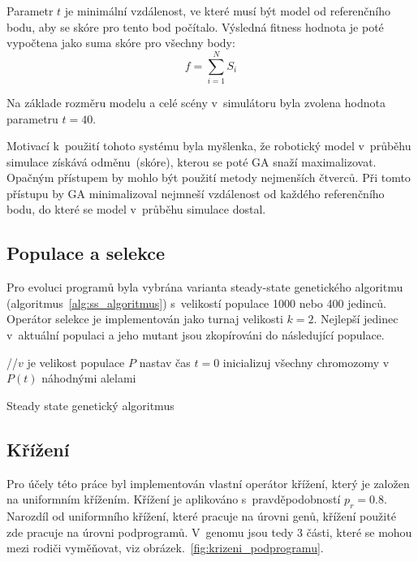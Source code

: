 Parametr $t$ je minimální vzdálenost, ve které musí být model od referenčního bodu, aby se skóre pro tento bod počítalo.
Výsledná fitness hodnota je poté vypočtena jako suma skóre pro všechny body:
$$f=\sum_{i=1}^{N}S_i$$

Na základe rozměru modelu a celé scény v~simulátoru byla zvolena hodnota parametru $t = 40$.

Motivací k~použití tohoto systému byla myšlenka, že robotický model v~průběhu simulace získává odměnu~(skóre), kterou se poté GA snaží maximalizovat.
Opačným přístupem by mohlo být použití metody nejmenších čtverců.
Při tomto přístupu by GA minimalizoval nejmneší vzdálenost od každého referenčního bodu, do které se model v~průběhu simulace dostal.

\subsection{Populace a selekce}
Pro evoluci programů byla vybrána varianta steady-state genetického algoritmu (algoritmus~\ref{alg:ss_algoritmus}) s~velikostí populace 1000 nebo 400 jedinců.
Operátor selekce je implementován jako turnaj velikosti $k = 2$.
Nejlepší jedinec v~aktuální populaci a jeho mutant jsou zkopírováni do následující populace.

\begin{algorithm}[H]
    //$v$ je velikost populace $P$\;
    nastav čas $t = 0$\;
    inicializuj všechny chromozomy v~$P(t)$ náhodnými alelami\;

    \caption{Steady state genetický algoritmus}
    \label{alg:ss_algoritmus}
\end{algorithm}

\subsection{Křížení}
\label{subs:krizeni_podprogramu}
Pro účely této práce byl implementován vlastní operátor křížení, který je založen na uniformním křížením.
Křížení je aplikováno s~pravděpodobností $p_r = 0.8$.
Narozdíl od uniformního křížení, které pracuje na úrovni genů, křížení použité zde pracuje na úrovni podprogramů.
V~genomu jsou tedy 3 části, které se mohou mezi rodiči vyměňovat, viz obrázek.~\ref{fig:krizeni_podprogramu}.

